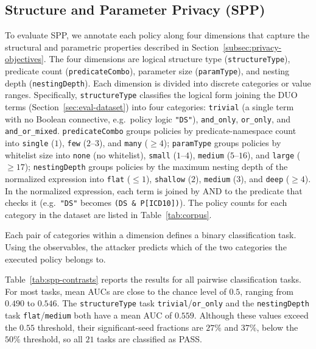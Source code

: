 \subsection{Structure and Parameter Privacy (SPP)}
\label{sec:eval-spp}

To evaluate SPP, we annotate each policy along four dimensions that capture the structural and parametric properties described in Section~\ref{subsec:privacy-objectives}.
The four dimensions are logical structure type (\texttt{structureType}), predicate count (\texttt{predicateCombo}), parameter size (\texttt{paramType}), and nesting depth (\texttt{nestingDepth}).
Each dimension is divided into discrete categories or value ranges.
Specifically, \texttt{structureType} classifies the logical form joining the DUO terms (Section~\ref{sec:eval-dataset}) into four categories: \texttt{trivial} (a single term with no Boolean connective, e.g.\ policy logic \texttt{"DS"}), \texttt{and\_only}, \texttt{or\_only}, and \texttt{and\_or\_mixed}.
\texttt{predicateCombo} groups policies by predicate-namespace count into \texttt{single} ($1$), \texttt{few} ($2$--$3$), and \texttt{many} ($\ge 4$);
\texttt{paramType} groups policies by whitelist size into \texttt{none} (no whitelist), \texttt{small} ($1$--$4$), \texttt{medium} ($5$--$16$), and \texttt{large} ($\ge 17$);
\texttt{nestingDepth} groups policies by the maximum nesting depth of the normalized expression into \texttt{flat} ($\le 1$), \texttt{shallow} ($2$), \texttt{medium} ($3$), and \texttt{deep} ($\ge 4$).
In the normalized expression, each term is joined by AND to the predicate that checks it (e.g.\ \texttt{"DS"} becomes \texttt{(DS \& P[ICD10])}).
The policy counts for each category in the dataset are listed in Table~\ref{tab:corpus}.

Each pair of categories within a dimension defines a binary classification task.
Using the observables, the attacker predicts which of the two categories the executed policy belongs to.

Table~\ref{tab:spp-contrasts} reports the results for all pairwise classification tasks.
For most tasks, mean AUCs are close to the chance level of $0.5$, ranging from $0.490$ to $0.546$.
The \texttt{structureType} task \texttt{trivial}/\texttt{or\_only} and the \texttt{nestingDepth} task \texttt{flat}/\texttt{medium} both have a mean AUC of $0.559$.
Although these values exceed the $0.55$ threshold, their significant-seed fractions are $27\%$ and $37\%$, below the $50\%$ threshold, so all $21$ tasks are classified as PASS.
